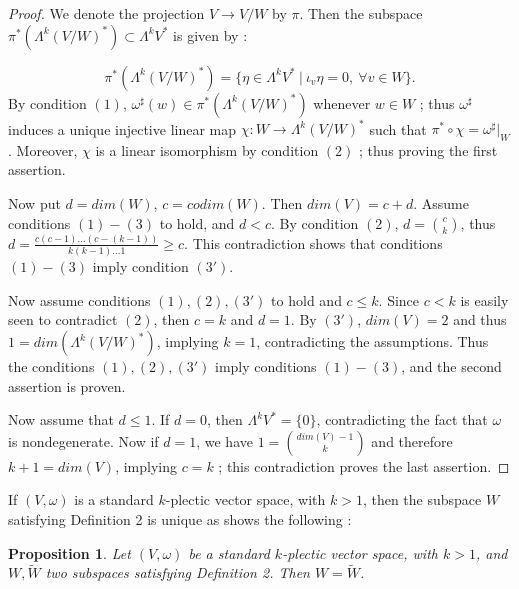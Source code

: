 \documentclass[a4paper,12pt,leqno]{article}
\newtheorem{prop}{Proposition}
\begin{document}
\begin{proof}
We denote the projection $V\rightarrow V/W$ by $\pi$. Then the subspace $\pi^*(\Lambda^k(V/W)^*)\subset \Lambda^kV^*$ is given by :


\begin{equation*}
\pi^*(\Lambda^k(V/W)^*)=\{\eta\in \Lambda^kV^* \ | \ \iota_v\eta=0, \ \forall v\in W\}.
\end{equation*}
By condition $(1)$, $\omega^{\sharp}(w)\in \pi^*(\Lambda^k(V/W)^*)$ whenever $w\in W$ ; thus $\omega^{\sharp}$ induces a 
unique injective linear map $\chi:W\rightarrow \Lambda^k(V/W)^*$ such that $\pi^*\circ\chi=\omega^{\sharp}|_W$. Moreover, $\chi$ is a linear isomorphism by condition $(2)$ ; thus proving the first assertion. 

Now put $d=dim(W)$, $c=codim(W)$. Then $dim(V)=c+d$. Assume conditions $(1)-(3)$ to hold, and $d<c$. By condition $(2)$, 
$d=\binom{c}{k}$, thus $d=\frac{c(c-1)...(c-(k-1))}{k(k-1)...1}\geq c$. This contradiction shows that conditions $(1)-(3)$ imply condition $(3')$. 

Now assume conditions $(1),(2),(3')$ to hold and $c\leq k$. Since $c<k$ is easily seen to contradict $(2)$, then $c=k$ and $d=1$. By $(3')$, $dim(V)=2$ and thus $1=dim(\Lambda^k(V/W)^*)$, implying $k=1$, contradicting the assumptions.
Thus the conditions $ (1),(2),(3')$ imply conditions $(1)-(3)$, and the second 
assertion is proven. 

Now assume that $d\leq1$. If $d=0$, then $\Lambda^kV^*=\{0\}$, contradicting the fact that $\omega$ is nondegenerate. Now if $d=1$, we have $1=\binom{dim(V)-1}{k}$ and therefore $k+1=dim(V)$, implying $c=k$ ; this contradiction proves the last assertion.
 
\end{proof}

If $(V,\omega)$ is a standard $k$-plectic vector space, with $k>1$, then the subspace $W$ satisfying Definition 2 is unique as shows the following :

\begin{prop}
Let $(V,\omega)$ be a standard $k$-plectic vector space, with $k>1$, and $W,\widetilde{W}$ two subspaces satisfying Definition 2. Then $W=\widetilde{W}$.
\end{prop}
\end{document}
